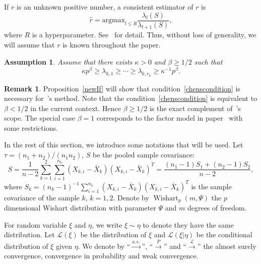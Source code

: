 \documentclass[review]{elsarticle}
\theoremstyle{plain}
\newtheorem{assumption}{\quad\quad Assumption}
\theoremstyle{definition}
\newtheorem{remark}{\quad\quad Remark}
\theoremstyle{remark}
\begin{document}
If $r$ is an unknown positive number, a consistent estimator of $r$ is
\begin{equation}\label{estimateR}
    \hat{r}=\textrm{argmax}_{l\leq R}\frac{\lambda_l(S)}{\lambda_{l+1}(S)},
\end{equation}
where $R$ is a hyperparameter.
    See~\cite{Ahn2009Eigenvalue} for detail.
    Thus, without loss of generality, we will assume that $r$ is known throughout the paper.

\begin{assumption}\label{orderOfBeta}
    Assume that there exists $\kappa>0$ and $\beta\geq {1}/{2}$ such that
    \begin{equation*}
        \kappa p^{\beta}\geq \lambda_{k,1}\geq \cdots \geq\lambda_{k,r_k}\geq \kappa^{-1}p^{\beta}.
\end{equation*}
\end{assumption}

\begin{remark}
Proposition~\ref{newIf} will show that condition~\eqref{chenscondition} is necessary for~\cite{Chen2010A}'s  method.
Note that the condition~\eqref{chenscondition} is equivalent to $\beta< 1/2$ in the current context.
Hence $\beta\geq 1/2$ is the exact complement of~\cite{Chen2010A}'s scope.
The special case $\beta=1$ corresponds to the factor model in paper~\cite{Ma2015A} with some restrictions.
\end{remark}

In the rest of this section, we introduce some  notations that will be used. Let $\tau={(n_1+n_2)}/{(n_1n_2)}$, $S$ be the pooled sample covariance:
\begin{equation*}
S=\frac{1}{n-2}\sum_{k=1}^2\sum_{i=1}^{n_k} (X_{k,i}-\bar{X}_k) {(X_{k,i}-\bar{X}_k)}^T
    =\frac{(n_1-1)S_1+(n_2-1)S_2}{n-2},
\end{equation*}
where
$S_k={(n_k -1)}^{-1}\sum_{i=1}^{n_k} (X_{k,i}-\bar{X}_k) {(X_{k,i}-\bar{X}_k)}^T
$
is the sample covariance  of the sample $k$, $k=1,2$.
Denote by $\operatorname{Wishart}_p(m,\Psi)$ the $p$ dimensional Wishart distribution with parameter $\Psi$ and $m$ degrees of freedom.

For random variable $\xi$ and $\eta$,
  we write $\xi\sim \eta$ to denote they have the same distribution.
  Let $\mathcal{L}(\xi)$ be the distribution of $\xi$ and $\mathcal{L}(\xi|\eta)$ be the conditional distribution of $\xi$ given $\eta$.
  We denote by ``$\xrightarrow{a.s.}$'', ``$\xrightarrow{P}$'' and ``$\xrightarrow{\mathcal{L}}$'' the almost surely convergence, convergence in probability and weak convergence.
\end{document}

